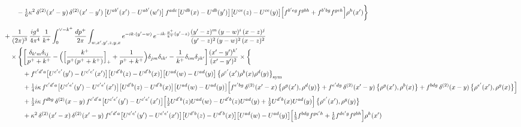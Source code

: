 \documentclass[10pt]{article}
\numberwithin{equation}{section}
\begin{document}
\begin{align}
&\qquad-\tfrac16\kappa^{2}\,\delta^{(2)}(x^{\prime}-y)\,\delta^{(2)}(x^{\prime}-y^{\prime})\,\big[U^{ab^{\prime}}(x^{\prime})-U^{ab^{\prime}}(w^{\prime})\big]\,f^{adc}\big[U^{db}(x)-U^{db}(y^{\prime})\big]\big[U^{ce}(z)-U^{ce}(y)\big]\Big[f^{b^{\prime}eg}f^{gbh}+f^{b^{\prime}bg}f^{geh}\Big]\rho^{h}(x^{\prime})\bigg\}\notag\\[6pt]
&+\frac{1}{(2\pi)^{3}}\,\frac{ig^{4}}{4\pi^{4}}\,\frac{1}{k^{+}}\int_{0}^{\vee-k^{+}}\frac{dp^{+}}{2\pi}\int_{w,x^{\prime},y^{\prime},z,y,x}e^{-ik\cdot(y^{\prime}-w)}\,e^{-ik\cdot\frac{p^{+}}{k^{+}}(y^{\prime}-z)}\frac{(y^{\prime}-z)^{m}\,(y-w)^{i}\,(x-z)^{j}}{(y^{\prime}-z)^{2}\,(y-w)^{2}\,(x-z)^{2}}\notag\\
&\quad\times\Bigg\{\bigg[\frac{\delta_{k^{\prime}m}\delta_{ij}}{p^{+}+k^{+}}-\Big(\Big[\frac{k^{+}}{p^{+}(p^{+}+k^{+})}\Big]_{+}+\frac{1}{p^{+}+k^{+}}\Big)\delta_{jm}\delta_{ik^{\prime}}-\frac{1}{k^{+}}\delta_{im}\delta_{jk^{\prime}}\bigg]\frac{(x^{\prime}-y^{\prime})^{k^{\prime}}}{(x^{\prime}-y^{\prime})^{2}}\times\bigg\{\notag\\
&\qquad\quad+f^{c^{\prime}d^{\prime}a}\big[U^{c^{\prime}e^{\prime}}(y^{\prime})-U^{c^{\prime}e^{\prime}}(x^{\prime})\big]\big[U^{d^{\prime}b}(z)-U^{d^{\prime}b}(x)\big]\big[U^{ad}(w)-U^{ad}(y)\big]\,\big\{\rho^{e^{\prime}}(x^{\prime})\rho^{b}(x)\rho^{d}(y)\big\}_{\rm sym}\notag\\
&\qquad\quad+\tfrac14 i\kappa\,f^{c^{\prime}d^{\prime}a}\big[U^{c^{\prime}e^{\prime}}(y^{\prime})-U^{c^{\prime}e^{\prime}}(x^{\prime})\big]\big[U^{d^{\prime}b}(z)-U^{d^{\prime}b}(x)\big]\big[U^{ad}(w)-U^{ad}(y)\big]\Big[f^{e^{\prime}bg}\,\delta^{(2)}(x^{\prime}-x)\,\big\{\rho^{g}(x^{\prime}),\rho^{d}(y)\big\}+f^{e^{\prime}dg}\,\delta^{(2)}(x^{\prime}-y)\,\big\{\rho^{g}(x^{\prime}),\rho^{b}(x)\big\}+f^{bdg}\,\delta^{(2)}(x-y)\,\big\{\rho^{e^{\prime}}(x^{\prime}),\rho^{g}(x)\big\}\Big]\notag\\
&\qquad\quad+\tfrac12 i\kappa\,f^{dbg}\,\delta^{(2)}(x-y)\,f^{c^{\prime}d^{\prime}a}\big[U^{c^{\prime}e^{\prime}}(y^{\prime})-U^{c^{\prime}e^{\prime}}(x^{\prime})\big]\Big[\tfrac12U^{d^{\prime}b}(z)U^{ad}(w)-U^{d^{\prime}b}(z)U^{ad}(y)+\tfrac12U^{d^{\prime}b}(x)U^{ad}(y)\Big]\,\big\{\rho^{e^{\prime}}(x^{\prime}),\rho^{g}(y)\big\}\notag\\
&\qquad\quad+\kappa^{2}\,\delta^{(2)}(x^{\prime}-x)\,\delta^{(2)}(x^{\prime}-y)\,f^{c^{\prime}d^{\prime}a}\big[U^{c^{\prime}e^{\prime}}(y^{\prime})-U^{c^{\prime}e^{\prime}}(x^{\prime})\big]\big[U^{d^{\prime}b}(z)-U^{d^{\prime}b}(x)\big]\big[U^{ad}(w)-U^{ad}(y)\big]\Big[\tfrac13f^{bdg}f^{ge^{\prime}h}+\tfrac16f^{de^{\prime}g}f^{gbh}\Big]\rho^{h}(x^{\prime})\notag\\

\end{align}
\end{document}
